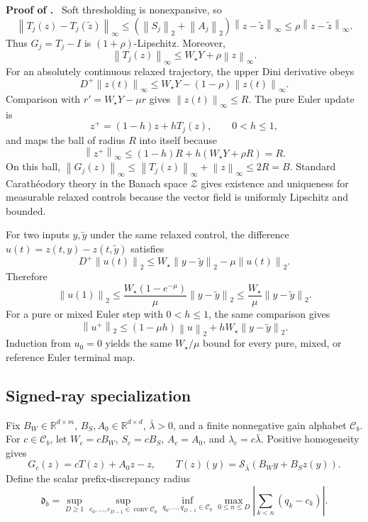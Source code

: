 \documentclass[twoside,11pt]{article}
\renewenvironment{proof}[1][Proof]{\par\noindent\textbf{#1.}\ }{\hfill\BlackBox\par\medskip}
\newcommand{\Z}{\mathcal{Z}}
\newcommand{\conv}{\operatorname{conv}}
\newcommand{\soft}{\mathcal{S}}
\newcommand{\norm}[1]{\left\lVert #1\right\rVert}
\begin{document}
\begin{proof}[Proof of ]
Soft thresholding is nonexpansive, so
\[
  \norm{T_j(z)-T_j(\widetilde z)}_\infty
  \le (\norm{S_j}_2+\norm{A_j}_2)\norm{z-\widetilde z}_\infty
  \le \rho\norm{z-\widetilde z}_\infty.
\]
Thus $G_j=T_j-I$ is $(1+\rho)$-Lipschitz.  Moreover,
\[
  \norm{T_j(z)}_\infty\le W_\star Y+\rho\norm{z}_\infty.
\]
For an absolutely continuous relaxed trajectory, the upper Dini derivative obeys
\[
  D^+\norm{z(t)}_\infty
  \le W_\star Y-(1-\rho)\norm{z(t)}_\infty.
\]
Comparison with $r'=W_\star Y-\mu r$ gives $\norm{z(t)}_\infty\le R$.  The pure Euler update is
\[
  z^+=(1-h)z+hT_j(z),\qquad 0<h\le1,
\]
and maps the ball of radius $R$ into itself because
\[
  \norm{z^+}_\infty\le(1-h)R+h(W_\star Y+\rho R)=R.
\]
On this ball, $\norm{G_j(z)}_\infty\le\norm{T_j(z)}_\infty+\norm{z}_\infty\le2R=B$.  Standard Carath\'eodory theory in the Banach space $\Z$ gives existence and uniqueness for measurable relaxed controls because the vector field is uniformly Lipschitz and bounded.

For two inputs $y,\widetilde y$ under the same relaxed control, the difference $u(t)=z(t,y)-z(t,\widetilde y)$ satisfies
\[
  D^+\norm{u(t)}_2
  \le W_\star\norm{y-\widetilde y}_2-\mu\norm{u(t)}_2.
\]
Therefore
\[
  \norm{u(1)}_2
  \le \frac{W_\star(1-e^{-\mu})}{\mu}\norm{y-\widetilde y}_2
  \le\frac{W_\star}{\mu}\norm{y-\widetilde y}_2.
\]
For a pure or mixed Euler step with $0<h\le1$, the same comparison gives
\[
 \norm{u^+}_2\le(1-\mu h)\norm{u}_2
   +hW_\star\norm{y-\widetilde y}_2.
\]
Induction from $u_0=0$ yields the same $W_\star/\mu$ bound for every pure,
mixed, or reference Euler terminal map.
\end{proof}



\subsection{Signed-ray specialization}
Fix $B_W\in\mathbb R^{d\times m}$,
$B_S,A_0\in\mathbb R^{d\times d}$, $\bar\lambda>0$, and a finite nonnegative
gain alphabet $\mathcal C_b$.  For $c\in\mathcal C_b$, let
$W_c=cB_W$, $S_c=cB_S$, $A_c=A_0$, and
$\lambda_c=c\bar\lambda$.  Positive homogeneity gives
\begin{equation}
 G_c(z)=cT(z)+A_0z-z,
 \qquad
 T(z)(y)=\soft_{\bar\lambda}(B_Wy+B_Sz(y)).
 \label{soft:eq:ray-field}
\end{equation}
Define the scalar prefix-discrepancy radius
\begin{equation}
 \mathfrak d_b=
 \sup_{D\ge1}\sup_{c_0,\ldots,c_{D-1}\in\conv\mathcal C_b}
 \inf_{q_0,\ldots,q_{D-1}\in\mathcal C_b}
 \max_{0\le n\le D}
 \left|\sum_{k<n}(q_k-c_k)\right|.
 \label{soft:eq:scalar-discrepancy}
\end{equation}
\end{document}
